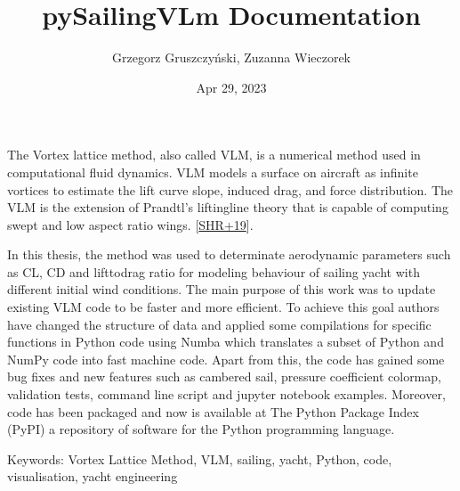 \documentclass[letterpaper,10pt,english]{jupyterBook}
\title{pySailingVLm Documentation}
\date{Apr 29, 2023}
\author{Grzegorz Gruszczyński, Zuzanna Wieczorek}
\begin{document}
\pagestyle{empty}
\sphinxmaketitle
\pagestyle{plain}
\sphinxtableofcontents
\pagestyle{normal}
\label{\detokenize{chapters/intro::doc}}


\sphinxAtStartPar
The Vortex lattice method, also called VLM, is a numerical method used in computational fluid dynamics. VLM models a surface on aircraft as infinite vortices to estimate the lift curve slope, induced drag, and force distribution. The VLM is the extension of Prandtl’s lifting\sphinxhyphen{}line theory that is capable of computing swept and low aspect ratio wings. {[}\hyperlink{cite.chapters/bibliography:id7}{SHR+19}{]}.

\sphinxAtStartPar
In this thesis, the method was used to determinate aerodynamic parameters such as CL, CD  and lift\sphinxhyphen{}to\sphinxhyphen{}drag ratio for modeling behaviour of sailing yacht with different initial wind conditions.
The main purpose of this work was to update existing VLM code to be faster and more efficient. To achieve this goal authors have changed the structure of data and applied some compilations for specific functions in Python code using Numba which translates a subset of Python and NumPy code into fast machine code. Apart from this, the code has gained some bug fixes and new features such as cambered sail, pressure coefficient colormap, validation tests, command line script and jupyter notebook examples. Moreover, code has been packaged and now is available at The Python Package Index (PyPI) \sphinxhyphen{} a repository of software for the Python programming language. 

\sphinxAtStartPar
Keywords: Vortex Lattice Method, VLM, sailing, yacht, Python, code, visualisation, yacht engineering
\end{document}
